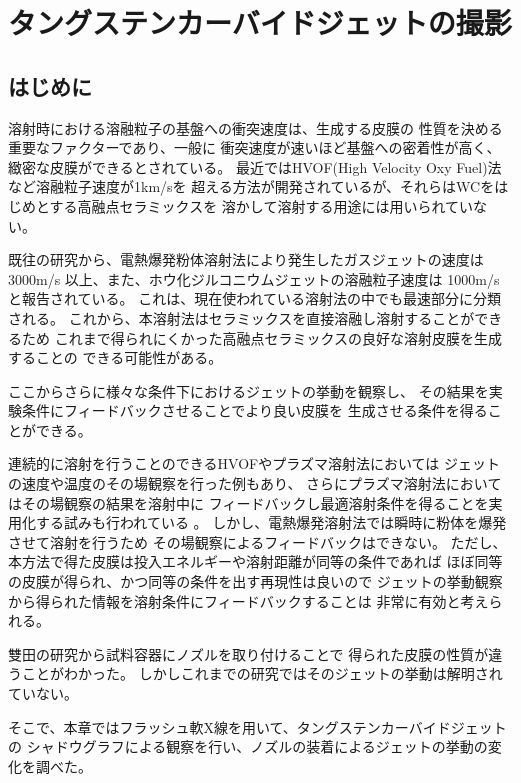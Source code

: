 

\chapter{タングステンカーバイドジェットの撮影}\label{ch:chapter3}

\section{はじめに}

溶射時における溶融粒子の基盤への衝突速度は、生成する皮膜の
性質を決める重要なファクターであり、一般に
衝突速度が速いほど基盤への密着性が高く、緻密な皮膜ができるとされている。
最近ではHVOF(High Velocity Oxy Fuel)法など溶融粒子速度が1km/sを
超える方法が開発されているが、それらはWCをはじめとする高融点セラミックスを
溶かして溶射する用途には用いられていない。

既往の研究から、電熱爆発粉体溶射法により発生したガスジェットの速度は
3000m/s \cite{Konoue2}以上、また、ホウ化ジルコニウムジェットの溶融粒子速度は
1000m/s \cite{Ikeda}と報告されている。
これは、現在使われている溶射法の中でも最速部分に分類される。
これから、本溶射法はセラミックスを直接溶融し溶射することができるため
これまで得られにくかった高融点セラミックスの良好な溶射皮膜を生成することの
できる可能性がある。

ここからさらに様々な条件下におけるジェットの挙動を観察し、
その結果を実験条件にフィードバックさせることでより良い皮膜を
生成させる条件を得ることができる。

連続的に溶射を行うことのできるHVOFやプラズマ溶射法においては
ジェットの速度や温度のその場観察を行った例もあり\cite{速度測定1}、
さらにプラズマ溶射法においてはその場観察の結果を溶射中に
フィードバックし最適溶射条件を得ることを実用化する試みも行われている
\cite{速度測定2}。
しかし、電熱爆発溶射法では瞬時に粉体を爆発させて溶射を行うため
その場観察によるフィードバックはできない。
ただし、本方法で得た皮膜は投入エネルギーや溶射距離が同等の条件であれば
ほぼ同等の皮膜が得られ、かつ同等の条件を出す再現性は良いので
ジェットの挙動観察から得られた情報を溶射条件にフィードバックすることは
非常に有効と考えられる。

雙田\cite{雙田修論}の研究から試料容器にノズルを取り付けることで
得られた皮膜の性質が違うことがわかった。
しかしこれまでの研究ではそのジェットの挙動は解明されていない。

そこで、本章ではフラッシュ軟X線を用いて、タングステンカーバイドジェットの
シャドウグラフによる観察を行い、ノズルの装着によるジェットの挙動の変化を調べた。

